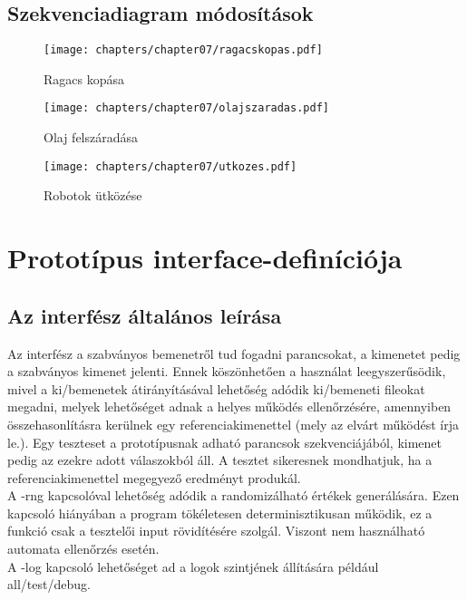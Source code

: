 \clearpage


\subsection{Szekvenciadiagram módosítások}
\begin{figure}[h]
	\begin{center}
		\texttt{[image: chapters/chapter07/ragacskopas.pdf]}
		\caption{Ragacs kopása}
		\label{Ragacs kopása}
	\end{center}
\end{figure}

\clearpage

\begin{figure}[h]
	\begin{center}
		\texttt{[image: chapters/chapter07/olajszaradas.pdf]}
		\caption{Olaj felszáradása}
		\label{Olaj felszáradása}
	\end{center}
\end{figure}

\clearpage

\begin{figure}[h]
	\begin{center}
		\texttt{[image: chapters/chapter07/utkozes.pdf]}
		\caption{Robotok ütközése}
		\label{Robotok ütközése}
	\end{center}
\end{figure}

\clearpage


\section{Prototípus interface-definíciója}

\subsection{Az interfész általános leírása}
Az interfész a szabványos bemenetről tud fogadni parancsokat, a kimenetet pedig a szabványos kimenet jelenti. Ennek köszönhetően a használat
leegyszerűsödik, mivel a ki/bemenetek átirányításával lehetőség adódik ki/bemeneti fileokat megadni, melyek lehetőséget adnak a helyes működés
ellenőrzésére, amennyiben összehasonlításra kerülnek egy referenciakimenettel (mely az elvárt működést írja le.). Egy teszteset a prototípusnak
adható parancsok szekvenciájából, kimenet pedig az ezekre adott válaszokból áll. A tesztet sikeresnek mondhatjuk, ha a referenciakimenettel 
megegyező eredményt produkál. \\
A -rng kapcsolóval lehetőség adódik a randomizálható értékek generálására. Ezen kapcsoló hiányában a program tökéletesen determinisztikusan működik,
ez a funkció csak a tesztelői input rövidítésére szolgál. Viszont nem használható automata ellenőrzés esetén.\\
A -log kapcsoló lehetőséget ad a logok szintjének állítására például all/test/debug. \\

